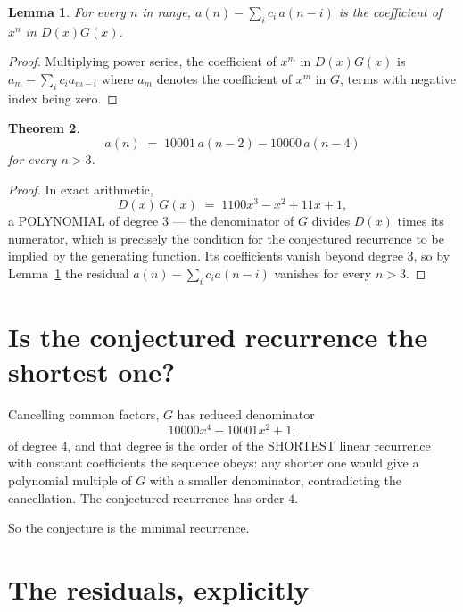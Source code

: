 \documentclass[11pt,a4paper]{article}
\theoremstyle{plain}
\newtheorem{theorem}{Theorem}
\newtheorem{lemma}[theorem]{Lemma}
\theoremstyle{definition}
\begin{document}
\begin{lemma}\label{lem:key}
For every $n$ in range, $a(n)-\sum_i c_i\,a(n-i)$ is the coefficient of $x^{n}$ in
$D(x)G(x)$.
\end{lemma}

\begin{proof}
Multiplying power series, the coefficient of $x^{m}$ in $D(x)G(x)$ is
$a_m-\sum_i c_i a_{m-i}$ where $a_m$ denotes the coefficient of $x^{m}$ in $G$, terms with
negative index being zero.
\end{proof}

\begin{theorem}
\[
a(n)\;=\;10001\,a(n-2) - 10000\,a(n-4)
\]
for every $n>3$.
\end{theorem}

\begin{proof}
In exact arithmetic,
\[
D(x)\,G(x)\;=\;1100 x^{3} - x^{2} + 11 x + 1,
\]
a POLYNOMIAL of degree $3$ --- the denominator of $G$ divides $D(x)$ times its numerator,
which is precisely the condition for the conjectured recurrence to be implied by the
generating function. Its coefficients vanish beyond degree $3$, so by
Lemma~\ref{lem:key} the residual $a(n)-\sum_ic_ia(n-i)$ vanishes for every
$n>3$.
\end{proof}

\section{Is the conjectured recurrence the shortest one?}

Cancelling common factors, $G$ has reduced denominator
\[
10000 x^{4} - 10001 x^{2} + 1,
\]
of degree $4$, and that degree is the order of the SHORTEST linear recurrence with
constant coefficients the sequence obeys: any shorter one would give a polynomial multiple of
$G$ with a smaller denominator, contradicting the cancellation. The conjectured recurrence has
order $4$.

So the conjecture is the minimal recurrence.

\section{The residuals, explicitly}
\end{document}
